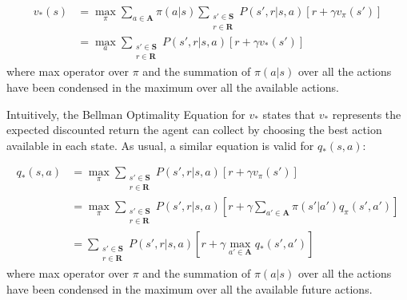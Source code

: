             \begin{definition}
                \label{def:bellmanoptvalue}
                \begin{align*}
                    v_{*}(s)    &= \max_{\pi} \sum_{a \in \mathbf{A}} \pi(a|s) 
                                \sum_{\substack{s' \in \mathbf{S}\\r \in \mathbf{R}}} P(s', r | s, a) 
                                \left[ r + \gamma v_{\pi}(s') \right] \\        
                                &= \max_{a} 
                                \sum_{\substack{s' \in \mathbf{S}\\r \in \mathbf{R}}} P(s', r | s, a) 
                                \left[ r
                                + \gamma v_{*}(s') \right]
                \end{align*}  
                where max operator over $\pi$ and the summation of $\pi(a|s)$ over all the actions have been condensed in the maximum over all the available actions.
            \end{definition}
            
            Intuitively, the Bellman Optimality Equation for $v_{*}$ states that $v_{*}$ represents the expected discounted return the agent can collect by choosing the best action available in each state. As usual, a similar equation is valid for $q_{*}(s,a)$:
            
            \begin{definition}
                \label{def:bellmanoptaction}
                \begin{align*}
                    q_{*}(s,a)  &= \max_{\pi}
                                \sum_{\substack{s' \in \mathbf{S}\\r \in \mathbf{R}}} P(s', r | s, a) 
                                \left[ r + \gamma v_{\pi}(s') \right] \\        
                                &= \max_{\pi}
                                \sum_{\substack{s' \in \mathbf{S}\\r \in \mathbf{R}}} P(s', r | s, a) 
                                \left[ r + \gamma \sum_{a' \in \mathbf{A}} \pi(s'|a') q_{\pi}(s',a') \right]\\
                                &= \sum_{\substack{s' \in \mathbf{S}\\r \in \mathbf{R}}} P(s', r | s, a) 
                                \left[ r + \gamma \max_{a' \in \mathbf{A}} q_{*}(s', a') \right]
                \end{align*}
                where max operator over $\pi$ and the summation of $\pi(a|s)$ over all the actions have been condensed in the maximum over all the available future actions.
            \end{definition}
            
